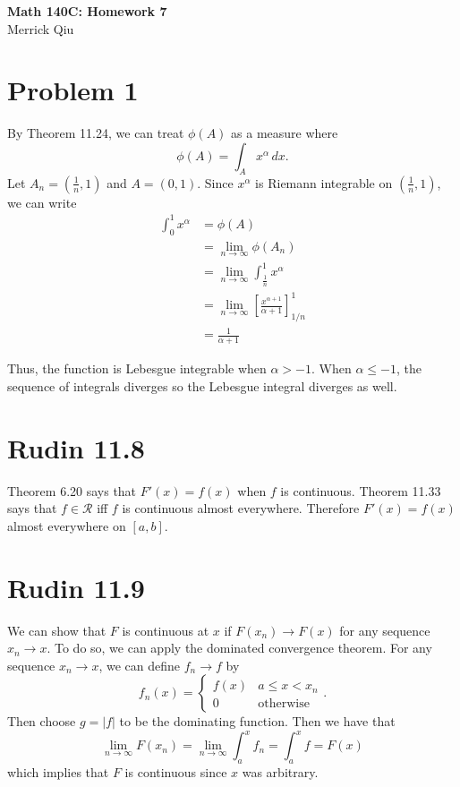 \documentclass{article}
\begin{document}
\begin{center}
	\huge{\bf Math 140C: Homework 7} \\
	Merrick Qiu
\end{center}

\section*{Problem 1}
By Theorem 11.24, we can treat $\phi(A)$ as a measure where
\[
	\phi(A) = \int_A x^\alpha \,dx.
\]
Let $A_n = (\frac{1}{n}, 1)$ and $A = (0,1)$.
Since $x^\alpha$ is Riemann integrable on $(\frac{1}{n},1)$, we can write
\begin{align*}
	\int_0^1 x^\alpha &= \phi(A) \\
	&= \lim_{n \to \infty} \phi(A_n) \\
	&= \lim_{n \to \infty} \int_\frac{1}{n}^1 x^\alpha \\
	&= \lim_{n \to \infty} \left[\frac{x^{\alpha+1}}{\alpha+1}\right]_{1/n}^1 \\
	&= \frac{1}{\alpha + 1}
\end{align*}

Thus, the function is Lebesgue integrable when $\alpha > -1$.
When $\alpha \leq -1$, the sequence of integrals diverges so the Lebesgue integral
diverges as well.
\newpage

\section*{Rudin 11.8}
Theorem 6.20 says that $F'(x) = f(x)$ when $f$ is continuous.
Theorem 11.33 says that $f \in \mathcal{R}$ iff $f$ is continuous almost everywhere.
Therefore $F'(x) = f(x)$ almost everywhere on $[a,b]$.
\newpage

\section*{Rudin 11.9}
We can show that $F$ is continuous at $x$ if 
$F(x_n) \to F(x)$ for any sequence $x_n \to x$.
To do so, we can apply the dominated convergence theorem.
For any sequence $x_n \to x$, we can define $f_n \to f$ by
\[
	f_n(x) = 
	\begin{cases}
		f(x) & a \leq x < x_n \\
		0	& \text{otherwise}
	\end{cases}.
\]
Then choose $g = |f|$ to be the dominating function.
Then we have that
\[
	\lim_{n\to \infty} F(x_n) = \lim_{n\to \infty} \int_a^x f_n = \int_a^x f = F(x)
\]
which implies that $F$ is continuous since $x$ was arbitrary.
\newpage
\end{document}
